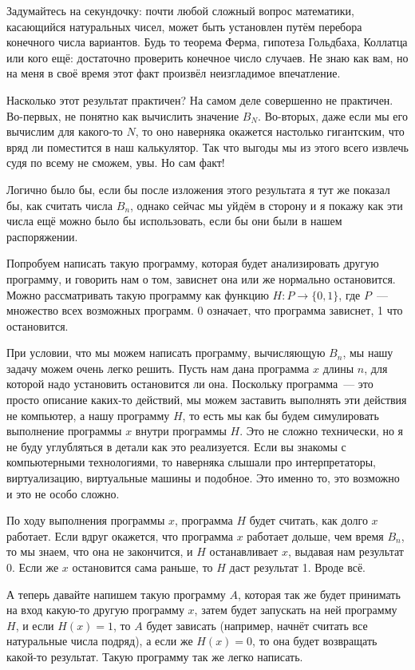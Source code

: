 Задумайтесь на секундочку: почти любой сложный вопрос математики, касающийся натуральных чисел, может быть установлен путём перебора конечного числа вариантов. Будь то теорема Ферма, гипотеза Гольдбаха, Коллатца или кого ещё: достаточно проверить конечное число случаев. Не знаю как вам, но на меня в своё время этот факт произвёл неизгладимое впечатление.

Насколько этот результат практичен? На самом деле совершенно не практичен. Во-первых, не понятно как вычислить значение $B_N$. Во-вторых, даже если мы его вычислим для какого-то $N$, то оно наверняка окажется настолько гигантским, что вряд ли поместится в наш калькулятор. Так что выгоды мы из этого всего извлечь судя по всему не сможем, увы. Но сам факт!

Логично было бы, если бы после изложения этого результата я тут же показал бы, как считать числа $B_n$, однако сейчас мы уйдём в сторону и я покажу как эти числа ещё можно было бы использовать, если бы они были в нашем распоряжении.

Попробуем написать такую программу, которая будет анализировать другую программу, и говорить нам о том, зависнет она или же нормально остановится. Можно рассматривать такую программу как функцию $H:P\to\{0,1\}$, где $P$~--- множество всех возможных программ. 0 означает, что программа зависнет, 1 что остановится.

При условии, что мы можем написать программу, вычисляющую $B_n$, мы нашу задачу можем очень легко решить. Пусть нам дана программа $x$ длины $n$, для которой надо установить остановится ли она. Поскольку программа~--- это просто описание каких-то действий, мы можем заставить выполнять эти действия не компьютер, а нашу программу $H$, то есть мы как бы будем симулировать выполнение программы $x$ внутри программы $H$. Это не сложно технически, но я не буду углубляться в детали как это реализуется. Если вы знакомы с компьютерными технологиями, то наверняка слышали про интерпретаторы, виртуализацию, виртуальные машины и подобное. Это именно то, это возможно и это не особо сложно.

По ходу выполнения программы $x$, программа $H$ будет считать, как долго $x$ работает. Если вдруг окажется, что программа $x$ работает дольше, чем время $B_n$, то мы знаем, что она не закончится, и $H$ останавливает $x$, выдавая нам результат 0. Если же $x$ остановится сама раньше, то $H$ даст результат 1. Вроде всё.

А теперь давайте напишем такую программу $A$, которая так же будет принимать на вход какую-то другую программу $x$, затем будет запускать на ней программу $H$, и если $H(x)=1$, то $A$ будет зависать (например, начнёт считать все натуральные числа подряд), а если же $H(x)=0$, то она будет возвращать какой-то результат. Такую программу так же легко написать.

